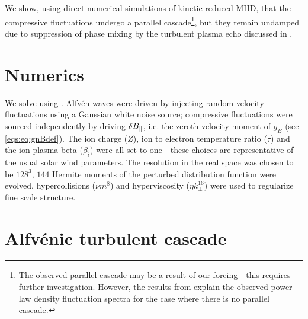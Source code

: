     We show, using direct numerical simulations of kinetic reduced MHD, that the
    compressive fluctuations undergo a parallel cascade\footnote{The observed parallel
    cascade may be a result of our forcing---this requires further investigation. However,
    the results from  explain the observed power law density fluctuation
    spectra for the case where there is no parallel cascade.}, but they remain
    undamped due to suppression of phase mixing by the turbulent plasma echo discussed in
    .

\section{Numerics} 

We solve  using \Gand. Alfv\'{e}n waves were
driven by injecting random velocity fluctuations using a Gaussian white noise source; 
compressive fluctuations were sourced independently by driving $\delta B_\parallel$, i.e. the zeroth
velocity moment of $g_B$ (see \eqref{eqs:eq:gnBdef}). The ion charge ($Z$), ion to electron
temperature ratio ($\tau$) and the ion plasma beta ($\beta_i$) were all set to 
one---these choices are representative of the usual solar wind parameters.
The resolution in the real space was
chosen to be $128^3$, $144$ Hermite moments of the perturbed distribution function were
evolved, hypercollisions ($\nu m^8$) and hyperviscosity
($\eta k_\perp^{16}$) were used to regularize fine scale structure.

\section{Alfv\'{e}nic turbulent cascade}

